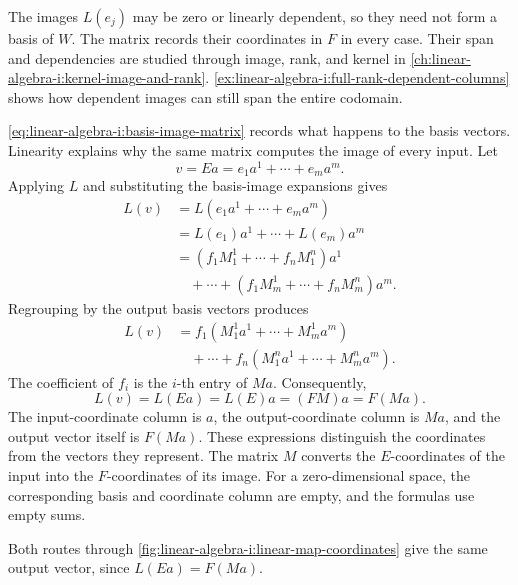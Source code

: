 The images \(L(e_j)\) may be zero or linearly dependent, so they need
not form a basis of \(W\). The matrix records their coordinates in
\(F\) in every case. Their span and dependencies are studied through
image, rank, and kernel in
\autoref{ch:linear-algebra-i:kernel-image-and-rank}.
\autoref{ex:linear-algebra-i:full-rank-dependent-columns} shows how
dependent images can still span the entire codomain.

\begin{pendingreview}
\autoref{eq:linear-algebra-i:basis-image-matrix} records what happens
to the basis vectors. Linearity explains why the same matrix computes
the image of every input. Let
\[
  v=Ea=e_1a^1+\cdots+e_ma^m.
\]
Applying \(L\) and substituting the basis-image expansions gives
\[
  \begin{aligned}
    L(v)&=L(e_1a^1+\cdots+e_ma^m)\\
      &=L(e_1)a^1+\cdots+L(e_m)a^m\\
      &=(f_1M^1_1+\cdots+f_nM^n_1)a^1\\
      &\quad+\cdots+(f_1M^1_m+\cdots+f_nM^n_m)a^m.
  \end{aligned}
\]
Regrouping by the output basis vectors produces
\[
  \begin{aligned}
    L(v)&=f_1(M^1_1a^1+\cdots+M^1_ma^m)\\
      &\quad+\cdots+f_n(M^n_1a^1+\cdots+M^n_ma^m).
  \end{aligned}
\]
The coefficient of \(f_i\) is the \(i\)-th entry of \(Ma\).
Consequently,
\[
  L(v)=L(Ea)=L(E)a=(FM)a=F(Ma).
\]
The input-coordinate column is \(a\), the output-coordinate column is
\(Ma\), and the output vector itself is \(F(Ma)\). These expressions
distinguish the coordinates from the vectors they represent. The matrix
\(M\) converts the \(E\)-coordinates of the input into the
\(F\)-coordinates of its image. For a zero-dimensional space, the
corresponding basis and coordinate column are empty, and the formulas
use empty sums.
\end{pendingreview}

Both routes through \autoref{fig:linear-algebra-i:linear-map-coordinates}
give the same output vector, since \(L(Ea)=F(Ma)\).
\begin{marginfigure}
  \centering
  
  \caption[Coordinates of a linear map]{Across the top, \(M\) acts on
    coordinates. Across the bottom, \(L\) acts on vectors. The vertical
    arrows reconstruct vectors in the bases \(E\) and \(F\).}
  \label{fig:linear-algebra-i:linear-map-coordinates}
\end{marginfigure}


